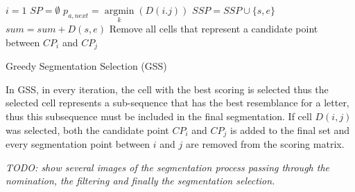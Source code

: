 \documentclass[journal,compsoc]{IEEEtran}
\begin{document}

\begin{algorithm}
$i={1}$\;
$SP=\emptyset$\;
{
	$p_{a,next} = \mathop {\arg \min}\limits_k (D(i.j))$\;
	$SSP = SSP \cup \{s,e\}$\;
	$sum = sum + D(s,e)$\;
	Remove all cells that represent a candidate point between $CP_{i}$ and $CP_{j}$\;
}
\caption{Greedy Segmentation Selection (GSS)}
\label{alg:gss}
\end{algorithm}


In GSS, in every iteration, the cell with the best scoring is selected thus the selected cell represents a sub-sequence that has the best resemblance for a letter, thus this subsequence must be included in the final segmentation. If cell $D(i,j)$ was selected, both the candidate point $CP_{i}$ and $CP_{j}$ is added to the final set and every segmentation point between $i$ and $j$ are removed from the scoring matrix.

\emph{TODO: show several images of the segmentation process passing through the nomination, the filtering and finally the segmentation selection.}
\end{document}
